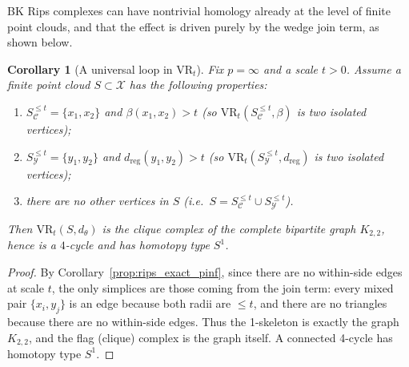 \documentclass[11pt]{amsart}
\newtheorem{corollary}[theorem]{Corollary}
\theoremstyle{definition}
\theoremstyle{remark}
\newcommand{\1}{\mathbbm{1}}
\newcommand{\VR}{\mathrm{VR}}
\begin{document}
BK Rips complexes can have nontrivial homology already at the level of
finite point clouds, and that the effect is driven purely by the wedge join term, as shown below.

\begin{corollary}[A universal loop in $\VR_t$]\label{ex:universal_loop}
Fix $p=\infty$ and a scale $t>0$.
Assume a finite point cloud $S\subset\mathcal X$ has the following properties:
\begin{enumerate}
\item $S_{\mathcal C}^{\le t}=\{x_1,x_2\}$ and $\beta(x_1,x_2)>t$ (so $\VR_t(S_{\mathcal C}^{\le t},\beta)$ is two isolated vertices);
\item $S_{\mathcal Y}^{\le t}=\{y_1,y_2\}$ and $d_{\mathrm{reg}}(y_1,y_2)>t$ (so $\VR_t(S_{\mathcal Y}^{\le t},d_{\mathrm{reg}})$ is two isolated vertices);
\item there are no other vertices in $S$ (i.e.\ $S=S_{\mathcal C}^{\le t}\cup S_{\mathcal Y}^{\le t}$).
\end{enumerate}
Then $\VR_t(S,d_\theta)$ is the clique complex of the complete bipartite graph $K_{2,2}$,
hence is a $4$-cycle and has homotopy type $S^1$.
\end{corollary}

\begin{proof}
By Corollary~\ref{prop:rips_exact_pinf}, since there are no within-side edges at scale $t$,
the only simplices are those coming from the join term:
every mixed pair $\{x_i,y_j\}$ is an edge because both radii are $\le t$,
and there are no triangles because there are no within-side edges.
Thus the 1-skeleton is exactly the graph $K_{2,2}$, and the flag (clique) complex is the graph itself.
A connected 4-cycle has homotopy type $S^1$.
\end{proof}

\usetikzlibrary{positioning}
\end{document}
